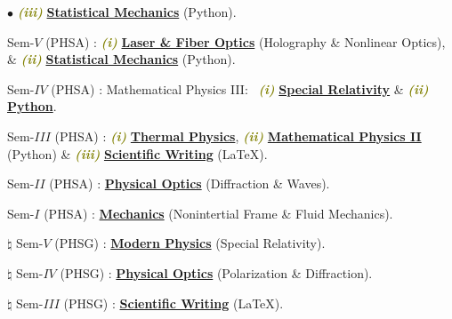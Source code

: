 \documentclass[margin,line]{res}
\newenvironment{list2}{
  \begin{list}{$\bullet$}{%
      \setlength{\itemsep}{0in}
      \setlength{\parsep}{0in} \setlength{\parskip}{0in}
      \setlength{\topsep}{0in} \setlength{\partopsep}{0in} 
      \setlength{\leftmargin}{0.2in}}}{\end{list}}
\begin{document}
\begin{resume}
\begin{list2}
                        \textcolor{olive}{\textit{\textbf{(iii)}}}
                        \href{https://amitbny.github.io/akb.github.io/sem5H_numerlab.html}{\bf Statistical Mechanics} (Python).
\item Sem-$V$ (PHSA) : \textcolor{olive}{\textit{\textbf{(i)}}} 
                       \href{https://amitbny.github.io/akb.github.io/sem5H_nloptics.html}{\bf Laser \& Fiber Optics} (Holography 
                       \& Nonlinear Optics), \& 
                       \textcolor{olive}{\textit{\textbf{(ii)}}} 
                       \href{https://amitbny.github.io/akb.github.io/sem5H_numerlab.html}{\bf Statistical Mechanics} (Python).
\item Sem-$IV$ (PHSA) : Mathematical Physics III:~ \textcolor{olive}{\textit{\textbf{(i)}}} 
                        \href{https://amitbny.github.io/akb.github.io/sem4H_SR.html}{\bf Special Relativity} \&
                        \textcolor{olive}{\textit{\textbf{(ii)}}} 
                        \href{https://amitbny.github.io/akb.github.io/sem4HA_numerlab.html}{\bf Python}. 
\item Sem-$III$ (PHSA) : \textcolor{olive}{\textit{\textbf{(i)}}} 
                         \href{https://amitbny.github.io/akb.github.io/sem3H_thermal.html}{\bf Thermal Physics}, 
                         \textcolor{olive}{\textit{\textbf{(ii)}}}
                         \href{https://amitbny.github.io/akb.github.io/sem3H_numerlab.html}{\bf Mathematical Physics II} (Python) \&
                         \textcolor{olive}{\textit{\textbf{(iii)}}} 
                         \href{https://amitbny.github.io/akb.github.io/sem3H_LaTeX.html}{\bf Scientific Writing} (\LaTeX). 
\item Sem-$II$ (PHSA) : \href{https://amitbny.github.io/akb.github.io/sem2H_wavesdiffr.html}{\bf Physical Optics} (Diffraction \& Waves).
\item Sem-$I$ (PHSA) : \href{https://amitbny.github.io/akb.github.io/sem1H_fluidniner.html}{\bf Mechanics} (Nonintertial Frame \& Fluid Mechanics). 
\item[$\pmb{\natural}$] Sem-$V$ (PHSG) : \href{https://amitbny.github.io/akb.github.io/sem5G_SR.html}{\bf Modern Physics} (Special Relativity).
\item[$\pmb{\natural}$] Sem-$IV$ (PHSG) : \href{https://amitbny.github.io/akb.github.io/sem4G_diffpolar.html}{\bf Physical Optics} (Polarization \& Diffraction).
\item[$\pmb{\natural}$] Sem-$III$ (PHSG) : \href{https://amitbny.github.io/akb.github.io/sem3H_LaTeX.html}{\bf Scientific Writing} (\LaTeX). 

\end{list2}
\end{resume}
\end{document}
